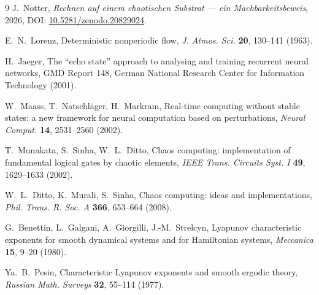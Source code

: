 \documentclass[11pt]{article}
\begin{document}

\begin{thebibliography}{9}
 J.~Notter,
  \emph{Rechnen auf einem chaotischen Substrat --- ein Machbarkeitsbeweis},
  2026, DOI: \href{https://doi.org/10.5281/zenodo.20829024}{10.5281/zenodo.20829024}.

 E.~N.~Lorenz,
  Deterministic nonperiodic flow,
  \emph{J. Atmos. Sci.} \textbf{20}, 130--141 (1963).

 H.~Jaeger,
  The ``echo state'' approach to analysing and training recurrent neural networks,
  GMD Report 148, German National Research Center for Information Technology (2001).

 W.~Maass, T.~Natschläger, H.~Markram,
  Real-time computing without stable states: a new framework for neural computation based on
  perturbations, \emph{Neural Comput.} \textbf{14}, 2531--2560 (2002).

 T.~Munakata, S.~Sinha, W.~L.~Ditto,
  Chaos computing: implementation of fundamental logical gates by chaotic elements,
  \emph{IEEE Trans. Circuits Syst. I} \textbf{49}, 1629--1633 (2002).

 W.~L.~Ditto, K.~Murali, S.~Sinha,
  Chaos computing: ideas and implementations,
  \emph{Phil. Trans. R. Soc. A} \textbf{366}, 653--664 (2008).

 G.~Benettin, L.~Galgani, A.~Giorgilli, J.-M.~Strelcyn,
  Lyapunov characteristic exponents for smooth dynamical systems and for Hamiltonian systems,
  \emph{Meccanica} \textbf{15}, 9--20 (1980).

 Ya.~B.~Pesin,
  Characteristic Lyapunov exponents and smooth ergodic theory,
  \emph{Russian Math. Surveys} \textbf{32}, 55--114 (1977).
\end{thebibliography}
\end{document}
